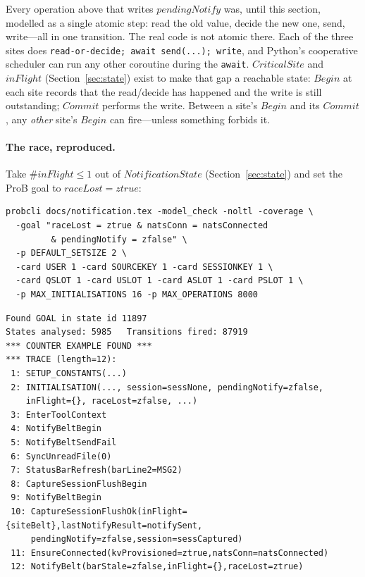 \documentclass[a4paper,10pt,fleqn]{article}
\begin{document}
Every operation above that writes $pendingNotify$ was, until this
section, modelled as a single atomic step: read the old value, decide
the new one, send, write---all in one transition.  The real code is not
atomic there.  Each of the three sites does
\texttt{read-or-decide; await send(...); write}, and Python's
cooperative scheduler can run any other coroutine during the
\texttt{await}.  $CriticalSite$ and $inFlight$ (Section~\ref{sec:state})
exist to make that gap a reachable state: $Begin$ at each site records
that the read/decide has happened and the write is still outstanding;
$Commit$ performs the write.  Between a site's $Begin$ and its $Commit$,
any \emph{other} site's $Begin$ can fire---unless something forbids it.

\paragraph{The race, reproduced.}  Take $\# inFlight \leq 1$ out of
$NotificationState$ (Section~\ref{sec:state}) and set the ProB goal to
$raceLost = ztrue$:

\begin{verbatim}
probcli docs/notification.tex -model_check -noltl -coverage \
  -goal "raceLost = ztrue & natsConn = natsConnected
         & pendingNotify = zfalse" \
  -p DEFAULT_SETSIZE 2 \
  -card USER 1 -card SOURCEKEY 1 -card SESSIONKEY 1 \
  -card QSLOT 1 -card USLOT 1 -card ASLOT 1 -card PSLOT 1 \
  -p MAX_INITIALISATIONS 16 -p MAX_OPERATIONS 8000
\end{verbatim}

\begin{verbatim}
Found GOAL in state id 11897
States analysed: 5985   Transitions fired: 87919
*** COUNTER EXAMPLE FOUND ***
*** TRACE (length=12):
 1: SETUP_CONSTANTS(...)
 2: INITIALISATION(..., session=sessNone, pendingNotify=zfalse,
    inFlight={}, raceLost=zfalse, ...)
 3: EnterToolContext
 4: NotifyBeltBegin
 5: NotifyBeltSendFail
 6: SyncUnreadFile(0)
 7: StatusBarRefresh(barLine2=MSG2)
 8: CaptureSessionFlushBegin
 9: NotifyBeltBegin
 10: CaptureSessionFlushOk(inFlight={siteBelt},lastNotifyResult=notifySent,
     pendingNotify=zfalse,session=sessCaptured)
 11: EnsureConnected(kvProvisioned=ztrue,natsConn=natsConnected)
 12: NotifyBelt(barStale=zfalse,inFlight={},raceLost=ztrue)
\end{verbatim}
\end{document}
